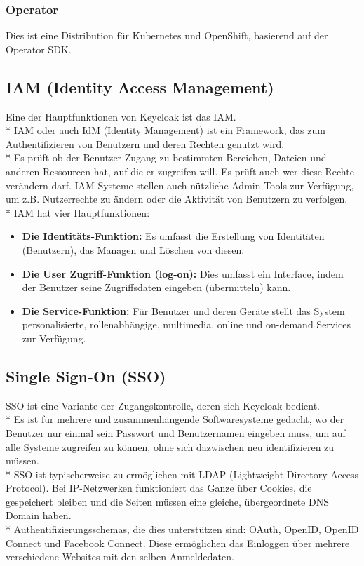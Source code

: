 \subsubsection{Operator}
Dies ist eine Distribution für Kubernetes und OpenShift, basierend auf der Operator SDK. \cite{KeyCloakDZone}
\subsection{IAM (Identity Access Management)}
\label{sec:IAM}
Eine der Hauptfunktionen von Keycloak ist das IAM. \\*
IAM oder auch IdM (Identity Management) ist ein Framework, das zum Authentifizieren von Benutzern und deren Rechten genutzt wird. \\*
Es prüft ob der Benutzer Zugang zu bestimmten Bereichen, Dateien und anderen Ressourcen hat, auf die er zugreifen will. Es prüft auch wer diese Rechte verändern darf.
IAM-Systeme stellen auch nützliche Admin-Tools zur Verfügung, um z.B. Nutzerrechte zu ändern oder die Aktivität von Benutzern zu verfolgen. \cite{KeycloakMakeIT} \\*
IAM hat vier Hauptfunktionen:
\begin{itemize}
    \item \textbf{Die Identitäts-Funktion: }Es umfasst die Erstellung von Identitäten (Benutzern), das Managen und Löschen von diesen.  
    \item \textbf{Die User Zugriff-Funktion (log-on): } Dies umfasst ein Interface, indem der Benutzer seine Zugriffsdaten eingeben (übermitteln) kann.
    \item \textbf{Die Service-Funktion: } Für Benutzer und deren Geräte stellt das System personalisierte, rollenabhängige, multimedia, online und on-demand Services zur Verfügung. \cite{KeycloakMakeIT}
\end{itemize}

\subsection{Single Sign-On (SSO)}
\label{sec:SSO}
SSO ist eine Variante der Zugangskontrolle, deren sich Keycloak bedient. \\*
Es ist für mehrere und zusammenhängende Softwaresysteme gedacht, wo der Benutzer nur einmal sein Passwort und Benutzernamen eingeben muss, um auf alle Systeme zugreifen zu können,
ohne sich dazwischen neu identifizieren zu müssen.\\* SSO ist typischerweise zu ermöglichen mit LDAP (Lightweight Directory Access Protocol). Bei IP-Netzwerken funktioniert das Ganze über Cookies, die gespeichert bleiben 
und die Seiten müssen eine gleiche, übergeordnete DNS Domain haben.\\* 
Authentifizierungsschemas, die dies unterstützen sind: OAuth, OpenID, OpenID Connect und Facebook Connect. Diese ermöglichen das Einloggen über mehrere verschiedene Websites mit den selben Anmeldedaten.\cite{KeycloakMakeIT}
